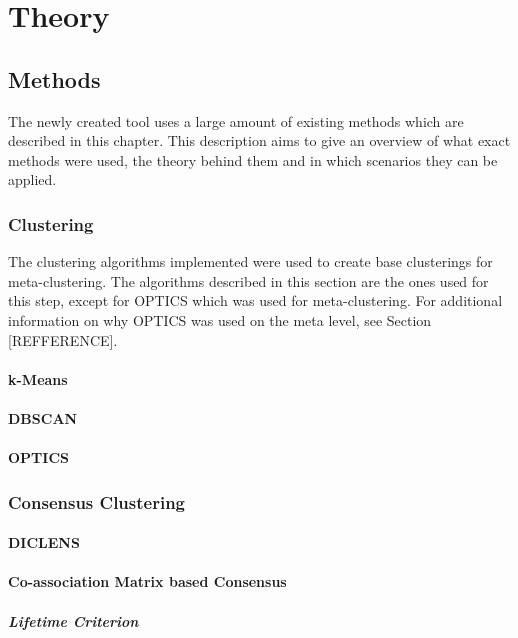 \documentclass[
	a4paper,
	english,
	twoside,
	openright,               
	11pt                            
	]{report}
\begin{document}
\part{Theory}
\chapter{Methods}
The newly created tool uses a large amount of existing methods which are described in this chapter. This description aims to give an overview of what exact methods were used, the theory behind them and in which scenarios they can be applied.

\section{Clustering}
The clustering algorithms implemented were used to create base clusterings for meta-clustering. The algorithms described in this section are the ones used for this step, except for OPTICS which was used for meta-clustering. For additional information on why OPTICS was used on the meta level, see Section [REFFERENCE].

\subsection{k-Means}

\subsection{DBSCAN}

\subsection{OPTICS}

\section{Consensus Clustering}
\subsection{DICLENS}

\subsection{Co-association Matrix based Consensus}

\subsubsection{Lifetime Criterion}
\end{document}
